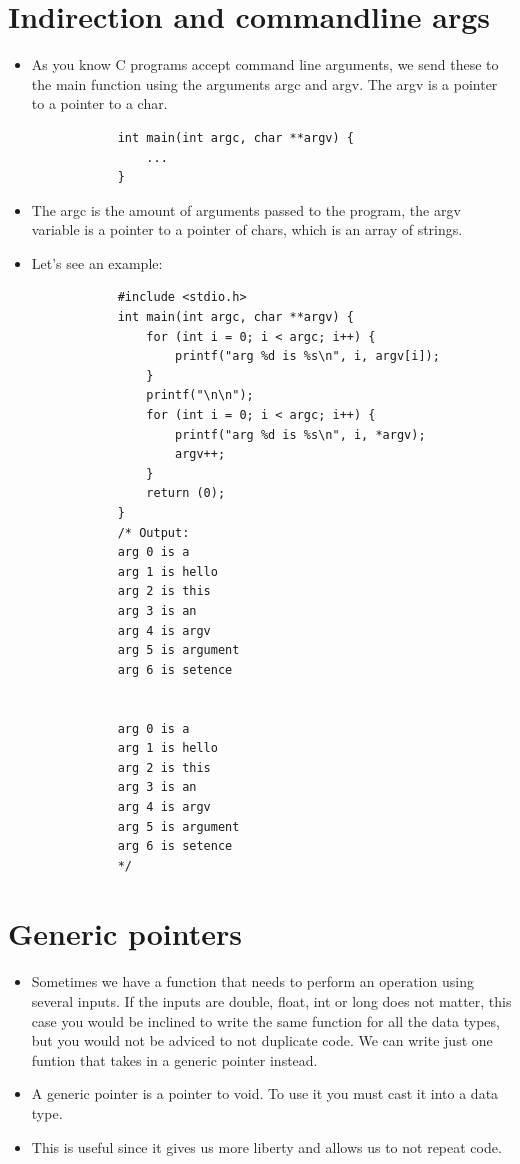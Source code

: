 \section{Indirection and commandline args}
\begin{itemize}
    \item As you know C programs accept command line arguments, we send these to the main function using the arguments argc and argv. The argv is a pointer to a pointer to a char.
        \begin{verbatim}
            int main(int argc, char **argv) {
                ...
            }
        \end{verbatim}
    
    \item The argc is the amount of arguments passed to the program, the argv variable is a pointer to a pointer of chars, which is an array of strings.
    \item Let's see an example:
        \begin{verbatim}
            #include <stdio.h>
            int main(int argc, char **argv) {
                for (int i = 0; i < argc; i++) {
                    printf("arg %d is %s\n", i, argv[i]);
                }
                printf("\n\n");
                for (int i = 0; i < argc; i++) {
                    printf("arg %d is %s\n", i, *argv);
                    argv++;
                }
                return (0);
            }
            /* Output:
            arg 0 is a
            arg 1 is hello
            arg 2 is this
            arg 3 is an
            arg 4 is argv
            arg 5 is argument
            arg 6 is setence


            arg 0 is a
            arg 1 is hello
            arg 2 is this
            arg 3 is an
            arg 4 is argv
            arg 5 is argument
            arg 6 is setence
            */
        \end{verbatim}
\end{itemize}

\section{Generic pointers}
\begin{itemize}
    \item Sometimes we have a function that needs to perform an operation using several inputs. If the inputs are double, float, int or long does not matter, this case you would be inclined to write the same function for all the data types, but you would not be adviced to not duplicate code. We can write just one funtion that takes in a generic pointer instead.
    \item A generic pointer is a pointer to void. To use it you must cast it into a data type.
    \item This is useful since it gives us more liberty and allows us to not repeat code.
\end{itemize}

